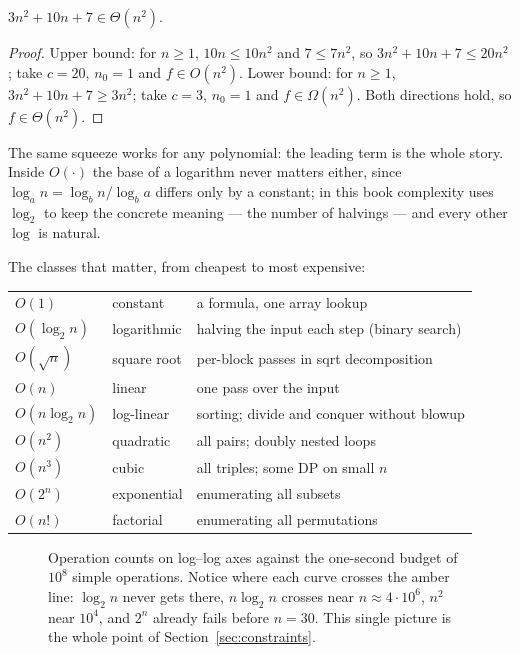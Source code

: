 \begin{theorem}\label{thm:thetapoly}
$3n^2 + 10n + 7 \in \Theta(n^2)$.
\end{theorem}

\begin{proof}
Upper bound: for $n \ge 1$, $10n \le 10n^2$ and $7 \le 7n^2$, so
$3n^2+10n+7 \le 20n^2$; take $c=20$, $n_0=1$ and $f \in O(n^2)$.
Lower bound: for $n \ge 1$, $3n^2+10n+7 \ge 3n^2$; take $c=3$, $n_0=1$
and $f \in \Omega(n^2)$. Both directions hold, so $f \in \Theta(n^2)$.
\end{proof}

The same squeeze works for any polynomial: the leading term is the whole
story. Inside $O(\cdot)$ the base of a logarithm never matters either, since
$\log_a n = \log_b n / \log_b a$ differs only by a constant; in this book
complexity uses $\log_2$ to keep the concrete meaning --- the number of
halvings --- and every other $\log$ is natural.

The classes that matter, from cheapest to most expensive:

\begin{center}
\begin{tabularx}{\linewidth}{@{}lYY@{}}
\toprule
{} &  & \\
\midrule
$O(1)$ & constant & a formula, one array lookup\\
$O(\log_2 n)$ & logarithmic & halving the input each step (binary search)\\
$O(\sqrt{n})$ & square root & per-block passes in sqrt decomposition\\
$O(n)$ & linear & one pass over the input\\
$O(n\log_2 n)$ & log-linear & sorting; divide and conquer without blowup\\
$O(n^2)$ & quadratic & all pairs; doubly nested loops\\
$O(n^3)$ & cubic & all triples; some DP on small $n$\\
$O(2^n)$ & exponential & enumerating all subsets\\
$O(n!)$ & factorial & enumerating all permutations\\
\bottomrule
\end{tabularx}
\end{center}

\begin{figure}[ht]\centering

\caption{Operation counts on log--log axes against the one-second budget of
$10^8$ simple operations. Notice where each curve crosses the amber line:
$\log_2 n$ never gets there, $n\log_2 n$ crosses near $n \approx 4\cdot10^6$,
$n^2$ near $10^4$, and $2^n$ already fails before $n=30$. This single picture
is the whole point of Section~\ref{sec:constraints}.}
\label{fig:growth}
\end{figure}

